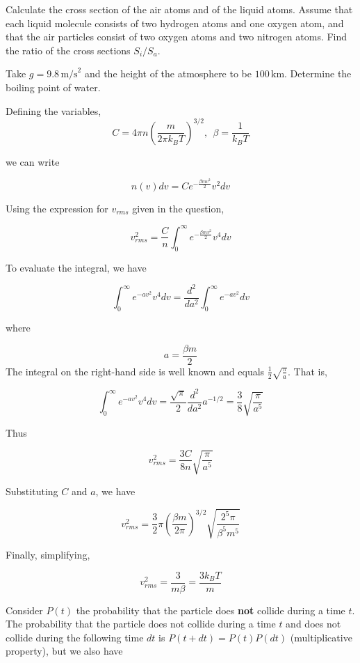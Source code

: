 \documentclass[11pt]{article}
\begin{document}
\begin{pproblem}
\begin{alternativas}
\item Calculate the cross section of the air atoms and of the liquid atoms. Assume that each liquid molecule consists of two hydrogen atoms and one oxygen atom, and that the air particles consist of two oxygen atoms and two nitrogen atoms. Find the ratio of the cross sections $S_i/S_a$.

\item Take $g = 9.8 \, \text{m/s}^2$ and the height of the atmosphere to be $100 \, \text{km}$. Determine the boiling point of water.

\end{alternativas}

\begin{pssolution*}{}{}
    \begin{alternativas}
    \item Defining the variables,
    \[C = 4\pi n \left(\frac{m}{2\pi k_B T}\right)^{3/2}, \ \ \beta = \frac{1}{k_BT}\]

    we can write

    \[n(v)dv = C e^{-\frac{\beta mv^2}{2}}v^2dv\]

    Using the expression for \(v_{rms}\) given in the question,

    \[v_{rms}^2 = \frac{C}{n}\int_0^\infty  e^{-\frac{\beta mv^2}{2}}v^4 dv\]

    To evaluate the integral, we have

    \[\int_0^{\infty} e^{-av^2}v^4 dv = \frac{d^2}{da^2}\int_0^{\infty} e^{-av^2}dv\] 

    where

    \[a = \frac{\beta m}{2}\]
    The integral on the right-hand side is well known and equals \(\frac{1}{2}\sqrt{\frac{\pi}{a}}\). That is,

    \[\int_0^{\infty} e^{-av^2}v^4 dv = \frac{\sqrt{\pi}}{2}\frac{d^2}{da^2}a^{-1/2} = \frac{3}{8}\sqrt{\frac{\pi}{a^5}}\]

    Thus

    \[v_{rms}^2 = \frac{3C}{8n}\sqrt{\frac{\pi}{a^5}}\]

    Substituting \(C\) and \(a\), we have

    \[v_{rms}^2 = \frac{3}{2}\pi  \left(\frac{\beta m}{2\pi}\right)^{3/2}\sqrt{\frac{2^5\pi}{\beta^5m^5}}\]
    
    Finally, simplifying,

    \[\boxed{v_{rms}^2 = \frac{3}{m\beta} = \frac{3k_B T}{m}}\]

    \item Consider \(P(t)\) the probability that the particle does \textbf{not} collide during a time \(t\). The probability that the particle does not collide during a time \(t\) and does not collide during the following time \(dt\) is \(P(t+dt) = P(t)P(dt)\) (multiplicative property), but we also have
    

\end{alternativas}
\end{pssolution*}
\end{pproblem}
\end{document}
